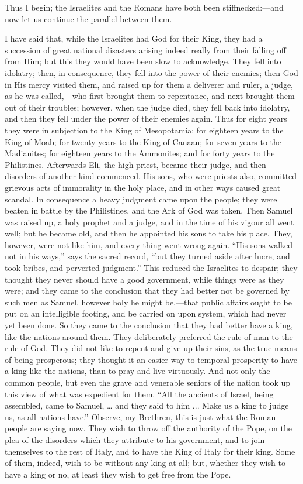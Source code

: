 Thus I begin; the Israelites and the Romans have both
been stiffnecked:—and now let us continue the
parallel between them.

I have said that, while the Israelites had God for
their King, they had a succession of great national
disasters arising indeed really from their falling off
from Him; but this they would have been slow to
acknowledge. They fell into idolatry; then, in
consequence, they fell into the power of their enemies;
then God in His mercy visited them, and raised up for
them a deliverer and ruler, a judge, as he was
called,—who first brought them to repentance, and
next brought them out of their troubles; however, when
the judge died, they fell back into idolatry, and then
they fell under the power of their enemies again. Thus
for eight years they were in subjection to the King of
Mesopotamia; for eighteen years to the King of Moab; for
twenty years to the King of Canaan; for seven years to
the Madianites; for eighteen years to the Ammonites; and
for forty years to the Philistines. Afterwards Eli, the
high priest, became their judge, and then disorders of
another kind commenced. His sons, who were priests also,
committed grievous acts of immorality in the holy place,
and in other ways caused great scandal. In consequence a
heavy judgment came upon the people; they were beaten in
battle by the Philistines, and the Ark of God was taken.
Then Samuel was raised up, a holy prophet and a judge,
and in the time of his vigour all went well; but he
became old, and then he appointed his sons to take his
place. They, however, were not like him, and every thing
went wrong again. ``His sons walked not in his
ways,'' says the sacred record, ``but they turned
aside after lucre, and took bribes, and perverted
judgment.'' This reduced the Israelites to despair;
they thought they never should have a good government,
while things were as they were; and they came to the
conclusion that they had better not be governed by such
men as Samuel, however holy he might be,—that public
affairs ought to be put on an intelligible footing, and
be carried on upon system, which had never yet been done.
So they came to the conclusion that they had better have
a king, like the nations around them. They deliberately
preferred the rule of man to the rule of God. They did
not like to repent and give up their sins, as the true
means of being prosperous; they thought it an easier way
to temporal prosperity to have a king like the nations,
than to pray and live virtuously. And not only the common
people, but even the grave and venerable seniors of the
nation took up this view of what was expedient for them.
``All the ancients of Israel, being assembled, came
to Samuel, … and they said to him ... Make us a king
to judge us, as all nations have.'' Observe, my
Brethren, this is just what the Roman people are saying
now. They wish to throw off the authority of the Pope, on
the plea of the disorders which they attribute to his
government, and to join themselves to the rest of Italy,
and to have the King of Italy for their king. Some of
them, indeed, wish to be without any king at all; but,
whether they wish to have a king or no, at least they
wish to get free from the Pope.

